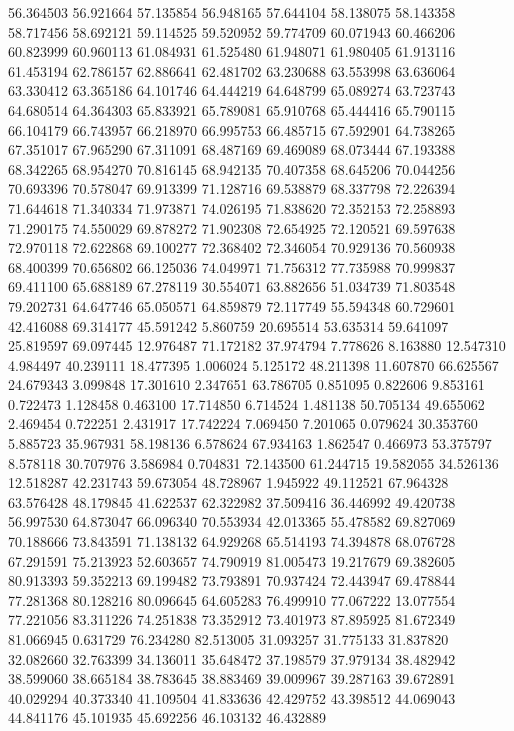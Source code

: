 56.364503
56.921664
57.135854
56.948165
57.644104
58.138075
58.143358
58.717456
58.692121
59.114525
59.520952
59.774709
60.071943
60.466206
60.823999
60.960113
61.084931
61.525480
61.948071
61.980405
61.913116
61.453194
62.786157
62.886641
62.481702
63.230688
63.553998
63.636064
63.330412
63.365186
64.101746
64.444219
64.648799
65.089274
63.723743
64.680514
64.364303
65.833921
65.789081
65.910768
65.444416
65.790115
66.104179
66.743957
66.218970
66.995753
66.485715
67.592901
64.738265
67.351017
67.965290
67.311091
68.487169
69.469089
68.073444
67.193388
68.342265
68.954270
70.816145
68.942135
70.407358
68.645206
70.044256
70.693396
70.578047
69.913399
71.128716
69.538879
68.337798
72.226394
71.644618
71.340334
71.973871
74.026195
71.838620
72.352153
72.258893
71.290175
74.550029
69.878272
71.902308
72.654925
72.120521
69.597638
72.970118
72.622868
69.100277
72.368402
72.346054
70.929136
70.560938
68.400399
70.656802
66.125036
74.049971
71.756312
77.735988
70.999837
69.411100
65.688189
67.278119
30.554071
63.882656
51.034739
71.803548
79.202731
64.647746
65.050571
64.859879
72.117749
55.594348
60.729601
42.416088
69.314177
45.591242
5.860759
20.695514
53.635314
59.641097
25.819597
69.097445
12.976487
71.172182
37.974794
7.778626
8.163880
12.547310
4.984497
40.239111
18.477395
1.006024
5.125172
48.211398
11.607870
66.625567
24.679343
3.099848
17.301610
2.347651
63.786705
0.851095
0.822606
9.853161
0.722473
1.128458
0.463100
17.714850
6.714524
1.481138
50.705134
49.655062
2.469454
0.722251
2.431917
17.742224
7.069450
7.201065
0.079624
30.353760
5.885723
35.967931
58.198136
6.578624
67.934163
1.862547
0.466973
53.375797
8.578118
30.707976
3.586984
0.704831
72.143500
61.244715
19.582055
34.526136
12.518287
42.231743
59.673054
48.728967
1.945922
49.112521
67.964328
63.576428
48.179845
41.622537
62.322982
37.509416
36.446992
49.420738
56.997530
64.873047
66.096340
70.553934
42.013365
55.478582
69.827069
70.188666
73.843591
71.138132
64.929268
65.514193
74.394878
68.076728
67.291591
75.213923
52.603657
74.790919
81.005473
19.217679
69.382605
80.913393
59.352213
69.199482
73.793891
70.937424
72.443947
69.478844
77.281368
80.128216
80.096645
64.605283
76.499910
77.067222
13.077554
77.221056
83.311226
74.251838
73.352912
73.401973
87.895925
81.672349
81.066945
0.631729
76.234280
82.513005
31.093257
31.775133
31.837820
32.082660
32.763399
34.136011
35.648472
37.198579
37.979134
38.482942
38.599060
38.665184
38.783645
38.883469
39.009967
39.287163
39.672891
40.029294
40.373340
41.109504
41.833636
42.429752
43.398512
44.069043
44.841176
45.101935
45.692256
46.103132
46.432889
